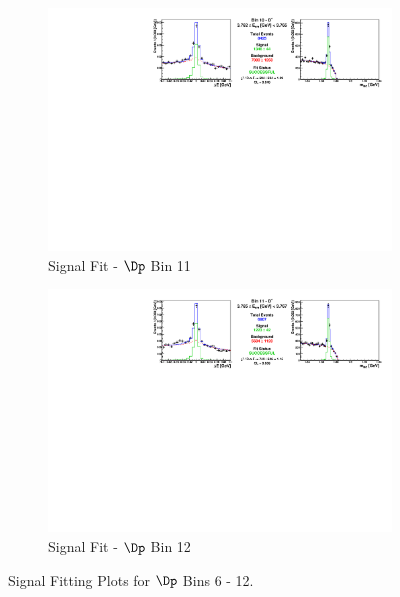\begin{figure}[h]
\begin{subfigure}[c]{0.99\textwidth}
\includegraphics[width=\textwidth]{figures/plots/fit_results/Dp_bin_10.pdf}
\caption*{Signal Fit - $\Dp$ Bin 11}
\end{subfigure}

\vspace{5pt}

\begin{subfigure}[c]{0.99\textwidth}
\includegraphics[width=\textwidth]{figures/plots/fit_results/Dp_bin_11.pdf}
\caption*{Signal Fit - $\Dp$ Bin 12}
\end{subfigure}

\caption{Signal Fitting Plots for $\Dp$ Bins 6 - 12.}
\label{fig:Dp_plots_6_12}

\end{figure}


